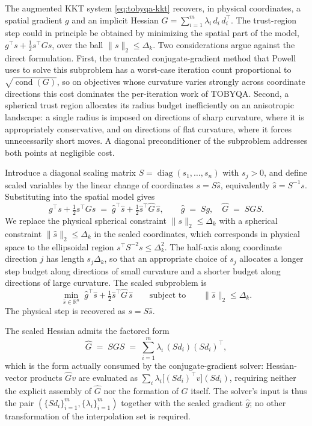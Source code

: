 \documentclass[11pt,a4paper]{article}
\newcommand{\R}{\mathbb{R}}
\begin{document}
The augmented KKT system \eqref{eq:tobyqa-kkt} recovers, in physical
coordinates, a spatial gradient $g$ and an implicit Hessian
$G = \sum_{i=1}^{m} \lambda_i\,d_i\,d_i^{\!\top}$. The trust-region
step could in principle be obtained by minimizing the spatial part
of the model, $g^\top s + \tfrac{1}{2} s^\top G s$, over the ball
$\|s\|_2 \le \Delta_k$. Two considerations argue against the direct
formulation. First, the truncated conjugate-gradient method that
Powell uses to solve this subproblem \cite{Powell2006NEWUOA} has a
worst-case iteration count proportional to
$\sqrt{\operatorname{cond}(G)}$, so on objectives whose curvature
varies strongly across coordinate directions this cost dominates
the per-iteration work of TOBYQA. Second, a spherical trust region
allocates its radius budget inefficiently on an anisotropic
landscape: a single radius is imposed on directions of sharp
curvature, where it is appropriately conservative, and on
directions of flat curvature, where it forces unnecessarily short
moves. A diagonal preconditioner of the subproblem addresses both
points at negligible cost.

Introduce a diagonal scaling matrix
$S = \operatorname{diag}(s_1, \dots, s_n)$ with $s_j > 0$, and
define scaled variables by the linear change of coordinates
$s = S \hat{s}$, equivalently $\hat{s} = S^{-1} s$. Substituting
into the spatial model gives
\begin{equation}\label{eq:Q-hat}
  g^\top s + \tfrac{1}{2} s^\top G s
  \;=\;
  \hat g^{\!\top}\hat s
  + \tfrac{1}{2}\hat s^{\!\top}\hat G\,\hat s,
  \qquad
  \hat g \;=\; S g, \quad
  \hat G \;=\; S G S.
\end{equation}
We replace the physical spherical constraint
$\|s\|_2\le\Delta_k$ with a spherical constraint
$\|\hat s\|_2\le\Delta_k$ in the scaled coordinates, which
corresponds in physical space to the ellipsoidal region
$s^\top S^{-2} s \le \Delta_k^2$. The half-axis along coordinate
direction $j$ has length $s_j\Delta_k$, so that an appropriate
choice of $s_j$ allocates a longer step budget along directions of
small curvature and a shorter budget along directions of large
curvature. The scaled subproblem is
\begin{equation}\label{eq:trsub-hat}
  \min_{\hat s \in \R^n}\;
  \hat g^{\!\top}\hat s
  + \tfrac{1}{2}\hat s^{\!\top}\hat G\,\hat s
  \qquad\text{subject to}\qquad
  \|\hat s\|_2 \le \Delta_k.
\end{equation}
The physical step is recovered as $s = S \hat s$.

The scaled Hessian admits the factored form
\begin{equation}\label{eq:Ghat-factored}
  \hat G \;=\; S G S
  \;=\;
  \sum_{i=1}^{m} \lambda_i\,(S d_i)(S d_i)^{\!\top},
\end{equation}
which is the form actually consumed by the conjugate-gradient
solver: Hessian-vector products $\hat G v$ are evaluated as
$\sum_i \lambda_i \bigl[(S d_i)^\top v\bigr] (S d_i)$, requiring
neither the explicit assembly of $\hat G$ nor the formation of $G$
itself. The solver's input is thus the pair
$(\{S d_i\}_{i=1}^{m},\{\lambda_i\}_{i=1}^{m})$ together with the
scaled gradient $\hat g$; no other transformation of the
interpolation set is required.
\end{document}
